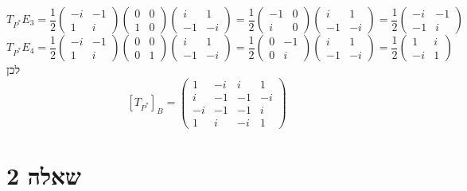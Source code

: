 \[
	T_{P^*} E_3 = \frac{1}{2}
	\begin{pmatrix} -i & -1 \\ 1 & i \end{pmatrix}
	\begin{pmatrix} 0 & 0 \\ 1 & 0 \end{pmatrix}
	\begin{pmatrix} i & 1 \\ -1 & -i \end{pmatrix}
	= \frac{1}{2}
	\begin{pmatrix} -1 & 0 \\ i & 0 \end{pmatrix}
	\begin{pmatrix} i & 1 \\ -1 & -i \end{pmatrix}
	= \frac{1}{2} \begin{pmatrix} -i & -1 \\ -1 & i \end{pmatrix}
\]
\[
	T_{P^*} E_4 = \frac{1}{2}
	\begin{pmatrix} -i & -1 \\ 1 & i \end{pmatrix}
	\begin{pmatrix} 0 & 0 \\ 0 & 1 \end{pmatrix}
	\begin{pmatrix} i & 1 \\ -1 & -i \end{pmatrix}
	= \frac{1}{2}
	\begin{pmatrix} 0 & -1 \\ 0 & i \end{pmatrix}
	\begin{pmatrix} i & 1 \\ -1 & -i \end{pmatrix}
	= \frac{1}{2} \begin{pmatrix} 1 & i \\ -i & 1 \end{pmatrix}
\]
לכן 
\[
	{[T_{P^*}]}_B = \begin{pmatrix}
		1 & -i & i & 1 \\
		i & -1 & -1 & -i \\
		-i & -1 & -1 & i \\
		1 & i & -i & 1
	\end{pmatrix}
\]

\section{שאלה 2}
